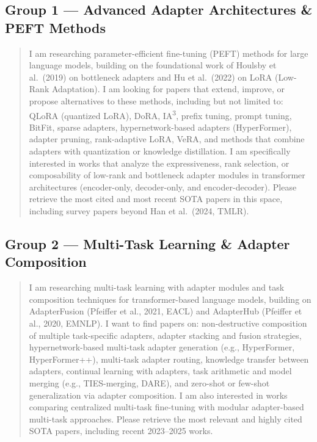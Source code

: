 \subsection*{Group 1 — Advanced Adapter Architectures \& PEFT Methods}
\label{app:undermind:g1}

\begin{quote}\small
I am researching parameter-efficient fine-tuning (PEFT) methods for large language
models, building on the foundational work of Houlsby et al.\ (2019) on bottleneck
adapters and Hu et al.\ (2022) on LoRA (Low-Rank Adaptation). I am looking for
papers that extend, improve, or propose alternatives to these methods, including but
not limited to: QLoRA (quantized LoRA), DoRA, IA\textsuperscript{3}, prefix tuning,
prompt tuning, BitFit, sparse adapters, hypernetwork-based adapters (HyperFormer),
adapter pruning, rank-adaptive LoRA, VeRA, and methods that combine adapters with
quantization or knowledge distillation. I am specifically interested in works that
analyze the expressiveness, rank selection, or composability of low-rank and bottleneck
adapter modules in transformer architectures (encoder-only, decoder-only, and
encoder-decoder). Please retrieve the most cited and most recent SOTA papers in this
space, including survey papers beyond Han et al.\ (2024, TMLR).
\end{quote}

\subsection*{Group 2 — Multi-Task Learning \& Adapter Composition}
\label{app:undermind:g2}

\begin{quote}\small
I am researching multi-task learning with adapter modules and task composition
techniques for transformer-based language models, building on AdapterFusion (Pfeiffer
et al., 2021, EACL) and AdapterHub (Pfeiffer et al., 2020, EMNLP). I want to find
papers on: non-destructive composition of multiple task-specific adapters, adapter
stacking and fusion strategies, hypernetwork-based multi-task adapter generation
(e.g., HyperFormer, HyperFormer++), multi-task adapter routing, knowledge transfer
between adapters, continual learning with adapters, task arithmetic and model merging
(e.g., TIES-merging, DARE), and zero-shot or few-shot generalization via adapter
composition. I am also interested in works comparing centralized multi-task
fine-tuning with modular adapter-based multi-task approaches. Please retrieve the
most relevant and highly cited SOTA papers, including recent 2023--2025 works.
\end{quote}

